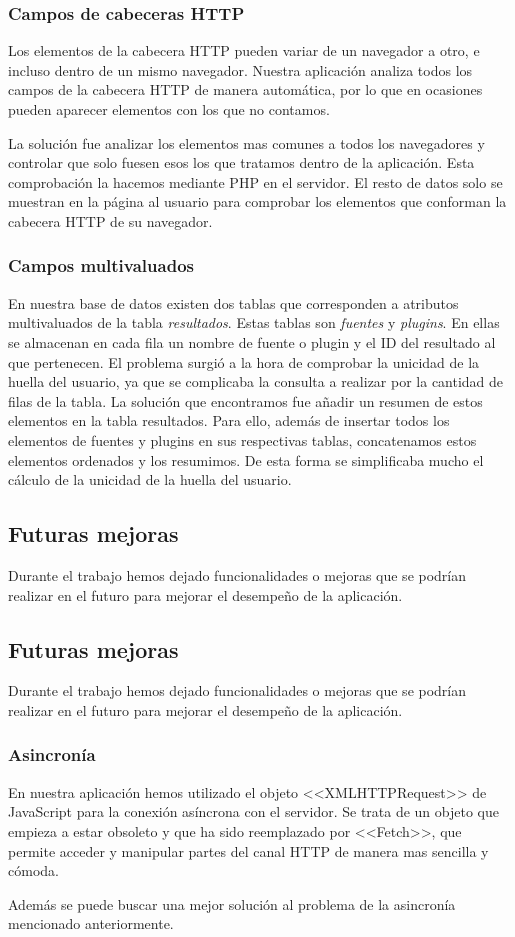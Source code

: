 \subsubsection{Campos de cabeceras HTTP}
Los elementos de la cabecera HTTP pueden variar de un navegador a otro, e incluso dentro de un mismo navegador. Nuestra aplicación analiza todos los campos de la cabecera HTTP de manera automática, por lo que en ocasiones pueden aparecer elementos con los que no contamos.\par 
La solución fue analizar los elementos mas comunes a todos los navegadores y controlar que solo fuesen esos los que tratamos dentro de la aplicación. Esta comprobación la hacemos mediante PHP en el servidor. El resto de datos solo se muestran en la página al usuario para comprobar los elementos que conforman la cabecera HTTP de su navegador.
\subsubsection{Campos multivaluados}
En nuestra base de datos existen dos tablas que corresponden a atributos multivaluados de la tabla \textit{resultados}. Estas tablas son \textit{fuentes} y \textit{plugins}. En ellas se almacenan en cada fila un nombre de fuente o plugin y el ID del resultado al que pertenecen. El problema surgió a la hora de comprobar la unicidad de la huella del usuario, ya que se complicaba la consulta a realizar por la cantidad de filas de la tabla. La solución que encontramos fue añadir un resumen de estos elementos en la tabla resultados. Para ello, además de insertar todos los elementos de fuentes y plugins en sus respectivas tablas, concatenamos estos elementos ordenados y los resumimos. De esta forma se simplificaba mucho el cálculo de la unicidad de la huella del usuario.
\subsection{Futuras mejoras}
Durante el trabajo hemos dejado funcionalidades o mejoras que se podrían realizar en el futuro para mejorar el desempeño de la aplicación.
\subsection{Futuras mejoras}
Durante el trabajo hemos dejado funcionalidades o mejoras que se podrían realizar en el futuro para mejorar el desempeño de la aplicación.
\subsubsection{Asincronía}
En nuestra aplicación hemos utilizado el objeto <<XMLHTTPRequest>> de JavaScript para la conexión asíncrona con el servidor. Se trata de un objeto que empieza a estar obsoleto y que ha sido reemplazado por <<Fetch>>, que permite acceder y manipular partes del canal HTTP de manera mas sencilla y cómoda.\par 
Además se puede buscar una mejor solución al problema de la asincronía mencionado anteriormente.
